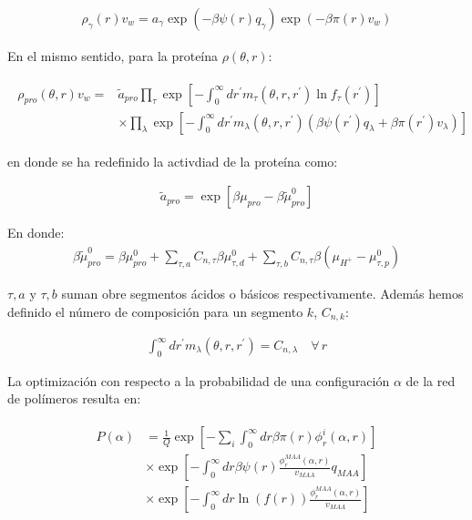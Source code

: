 \begin{align}
	\rho_\gamma(r)v_w = a_\gamma \exp{\left(-\beta \psi(r)q_\gamma\right)} \exp{\left(-\beta\pi(r) v_w\right)}
\end{align}


En el mismo sentido, para la prote\'ina $\rho(\theta,r)$:
	
	

\begin{align}
	\begin{aligned}
		\rho_{pro}(\theta, r)v_w = & \tilde{a}_{pro} \prod_\tau \exp\left[ -\int_0^\infty dr^\prime  m_\tau(\theta,r,r^\prime) \ln f_\tau(r^\prime)\right] \\
		& \times \prod_\lambda \exp\left[ -\int_0^\infty dr^\prime  m_\lambda(\theta,r,r^\prime)\left( \beta\psi(r^\prime) q_\lambda + \beta \pi(r^\prime) v_\lambda \right)\right]
	\end{aligned}
	\label{eq:esf:rho-pro}
\end{align}
	
	\noindent en donde se ha redefinido la activdiad de la prote\'ina como:
	
	\begin{align}
		\tilde{a}_{pro} = \exp[\beta\mu_{pro} - \beta\tilde{\mu}^0_{pro}]
	\end{align}
	
		
En donde:
\begin{align}
	\beta\tilde{\mu}^0_{pro} =  \beta \mu^0_{pro}  + \sum_{\tau,a} C_{n,\tau}\beta\mu^0_{\tau,d} 
	+ \sum_{\tau,b} C_{n,\tau}\beta(\mu_{H^+} - \mu^0_{\tau,p})
\end{align}


\noindent $\tau,a$ y  $\tau,b$ suman obre segmentos \'acidos o b\'asicos respectivamente. Adem\'as hemos definido el n\'umero de composici\'on para un segmento $k$, $C_{n,k}$:

	\begin{align}
		\int_0^\infty dr^\prime  m_\lambda(\theta,r,r^\prime) = C_{n,\lambda}\quad \forall \, r
		\label{eq:esf:composition}
	\end{align}

La optimizaci\'on con respecto a la probabilidad de una configuraci\'on $\alpha$ de la red de pol\'imeros resulta en:


\begin{align}
	\begin{aligned}
		P(\alpha)&=\frac{1}{Q}\exp\left[- \sum_i{\int_0^\infty{dr\beta\pi(r)\phi^i_r(\alpha,r)}}\right] \\
		& \times \exp \left[ -\int_0^\infty dr \beta \psi(r)\frac{\phi^{MAA}_r(\alpha,r)}{v_{MAA}} q_{MAA}  \right] \\
		& \times \exp\left[ -\int_0^\infty{ dr\ln(f(r))\frac{\phi^{MAA}_r(\alpha,r)}{v_{MAA}}}\right] \\
	\end{aligned}
	\label{eq:esf:proba-alfa}
\end{align}

